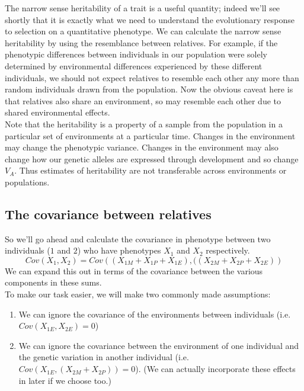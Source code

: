 The narrow sense heritability of a trait is a useful quantity; indeed
we'll see shortly that it is exactly what we need to understand the
evolutionary response to selection on a quantitative phenotype. We can
calculate the narrow sense heritability by using the resemblance between
relatives. For example, if the phenotypic differences between individuals in our population were solely determined by environmental differences experienced by these different individuals, we
should not expect relatives to resemble each other any more than random
individuals drawn from the population. Now the obvious caveat here is
that relatives also share an environment, so may resemble each other
due to shared environmental effects. \\

Note that the heritability is a property of a sample from the population in a particular set of environments at a particular time. Changes in the environment may change the phenotypic variance. Changes in the environment may also change how our genetic alleles are expressed through development and so change $V_A$. Thus estimates of heritability are not transferable across environments or populations. 

\subsection{The covariance between relatives}
So we'll go ahead and calculate the covariance in phenotype between two individuals
($1$ and $2$) who have phenotypes $X_1$ and $X_2$ respectively.
\begin{equation}
Cov(X_1,X_2) =
Cov\left((X_{1M}+X_{1P}+X_{1E}),((X_{2M}+X_{2P}+X_{2E}) \right)
\end{equation}
We can expand this out in terms of the covariance between the various
components in these sums.\\

To make our task easier, we will make two commonly made assumptions:
\begin{enumerate}
\item We can ignore the covariance of the environments
between individuals (i.e. $Cov(X_{1E},X_{2E})=0$)
\item We can ignore the covariance
between the environment of one individual and the
genetic variation in another individual (i.e. $Cov(X_{1E},(X_{2M}+X_{2P}))=0$). (We can actually incorporate these effects in later if we choose too.)
\end{enumerate}

